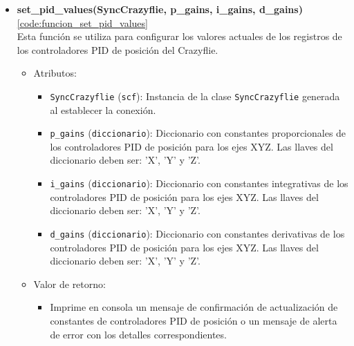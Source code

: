 \begin{itemize}
	\item \textbf{set\_pid\_values(SyncCrazyflie, p\_gains, i\_gains, d\_gains)} \ref{code:funcion_set_pid_values}\\ 
	Esta función se utiliza para configurar los valores actuales de los registros de los controladores PID de posición del Crazyflie.
	\begin{itemize}
		\item Atributos:
		\begin{itemize}
			\item \texttt{SyncCrazyflie} (\texttt{scf}): Instancia de la clase \texttt{SyncCrazyflie} generada al establecer la conexión.
			\item \texttt{p\_gains} (\texttt{diccionario}): Diccionario con constantes proporcionales de los controladores PID de posición para los ejes XYZ. Las llaves del diccionario deben ser: 'X', 'Y' y 'Z'.
			\item \texttt{i\_gains} (\texttt{diccionario}): Diccionario con constantes integrativas de los controladores PID de posición para los ejes XYZ. Las llaves del diccionario deben ser: 'X', 'Y' y 'Z'.
			\item \texttt{d\_gains} (\texttt{diccionario}): Diccionario con constantes derivativas de los controladores PID de posición para los ejes XYZ. Las llaves del diccionario deben ser: 'X', 'Y' y 'Z'.
		\end{itemize}
		\item Valor de retorno:
		\begin{itemize}
			\item Imprime en consola un mensaje de confirmación de actualización de constantes de controladores PID de posición o un mensaje de alerta de error con los detalles correspondientes.
		\end{itemize}
	\end{itemize} 
	\vspace{1mm} %
	

\end{itemize}
